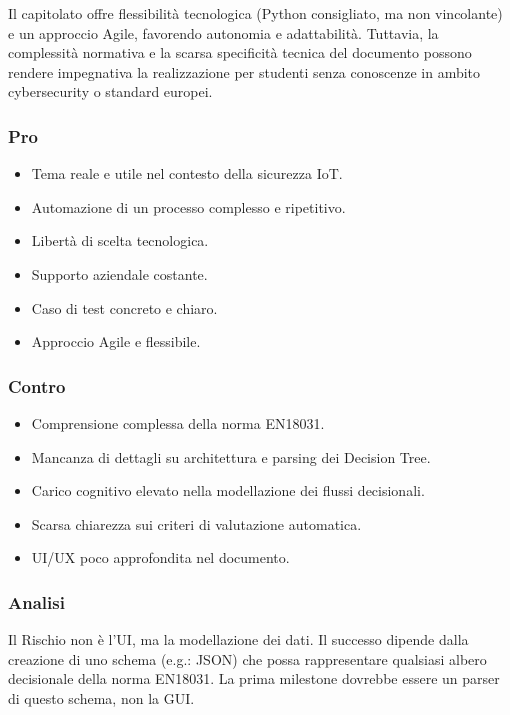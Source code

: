 \documentclass[a4paper, 11pt, oneside]{scrartcl} %
\begin{document}
Il capitolato offre flessibilità tecnologica (Python consigliato, ma non vincolante) e un approccio Agile, favorendo autonomia e adattabilità. Tuttavia, la complessità normativa e la scarsa specificità tecnica del documento possono rendere impegnativa la realizzazione per studenti senza conoscenze in ambito cybersecurity o standard europei.

\subsubsection*{Pro}
\begin{itemize}
    \item Tema reale e utile nel contesto della sicurezza IoT.
    \item Automazione di un processo complesso e ripetitivo.
    \item Libertà di scelta tecnologica.
    \item Supporto aziendale costante.
    \item Caso di test concreto e chiaro.
    \item Approccio Agile e flessibile.
\end{itemize}

\subsubsection*{Contro}
\begin{itemize}
    \item Comprensione complessa della norma EN18031.
    \item Mancanza di dettagli su architettura e parsing dei Decision Tree.
    \item Carico cognitivo elevato nella modellazione dei flussi decisionali.
    \item Scarsa chiarezza sui criteri di valutazione automatica.
    \item UI/UX poco approfondita nel documento.
\end{itemize}
\subsubsection*{Analisi}
Il Rischio non è l'UI, ma la modellazione dei dati. Il successo dipende dalla creazione di uno schema (e.g.: JSON) che possa rappresentare qualsiasi albero decisionale della norma EN18031. La prima milestone dovrebbe essere un parser di questo schema, non la GUI.

\end{document}
